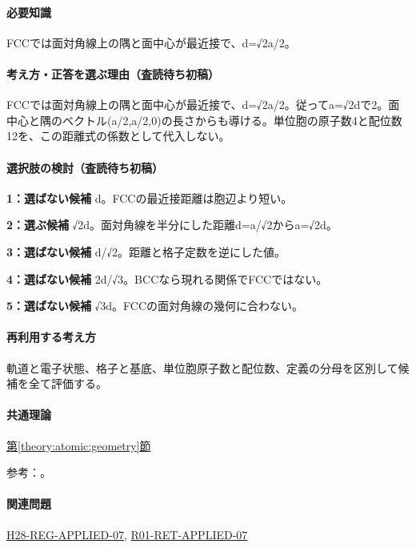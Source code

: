 \paragraph{必要知識} FCCでは面対角線上の隅と面中心が最近接で、d=√2a/2。

\paragraph{考え方・正答を選ぶ理由（査読待ち初稿）} FCCでは面対角線上の隅と面中心が最近接で、d=√2a/2。従ってa=√2dで2。面中心と隅のベクトル(a/2,a/2,0)の長さからも導ける。単位胞の原子数4と配位数12を、この距離式の係数として代入しない。

\paragraph{選択肢の検討（査読待ち初稿）}\mbox{}\par

\noindent\textbf{1：選ばない候補} d。FCCの最近接距離は胞辺より短い。\par

\noindent\textbf{2：選ぶ候補} √2d。面対角線を半分にした距離d=\allowbreak{}a/√2からa=√2d。\par

\noindent\textbf{3：選ばない候補} d/√2。距離と格子定数を逆にした値。\par

\noindent\textbf{4：選ばない候補} 2d/√3。BCCなら現れる関係でFCCではない。\par

\noindent\textbf{5：選ばない候補} √3d。FCCの面対角線の幾何に合わない。\par

\paragraph{再利用する考え方} 軌道と電子状態、格子と基底、単位胞原子数と配位数、定義の分母を区別して候補を全て評価する。

\paragraph{共通理論} \hyperref[theory:atomic:geometry]{第\ref*{theory:atomic:geometry}節}

\par 参考：\cite{openstax_crystals}。

\paragraph{関連問題} \hyperref[q:h28-reg-applied-07]{H28-REG-APPLIED-07}, \hyperref[q:r01-ret-applied-07]{R01-RET-APPLIED-07}

